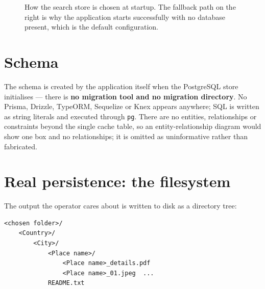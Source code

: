 \documentclass[11pt,a4paper]{report}
\newcommand{\code}[1]{\texttt{\small #1}}
\begin{document}
\begin{figure}[H]
\centering
{}
\caption[Storage selection]{How the search store is chosen at startup. The
fallback path on the right is why the application starts successfully with no
database present, which is the default configuration.}
\label{fig:storage}
\end{figure}

\section{Schema}

The schema is created by the application itself when the PostgreSQL store
initialises --- there is \textbf{no migration tool and no migration directory}.
No Prisma, Drizzle, TypeORM, Sequelize or Knex appears anywhere; SQL is written
as string literals and executed through \code{pg}. There are no entities,
relationships or constraints beyond the single cache table, so an
entity-relationship diagram would show one box and no relationships; it is
omitted as uninformative rather than fabricated.

\section{Real persistence: the filesystem}

The output the operator cares about is written to disk as a directory tree:

\begin{verbatim}
<chosen folder>/
    <Country>/
        <City>/
            <Place name>/
                <Place name>_details.pdf
                <Place name>_01.jpeg  ...
            README.txt
\end{verbatim}
\end{document}
